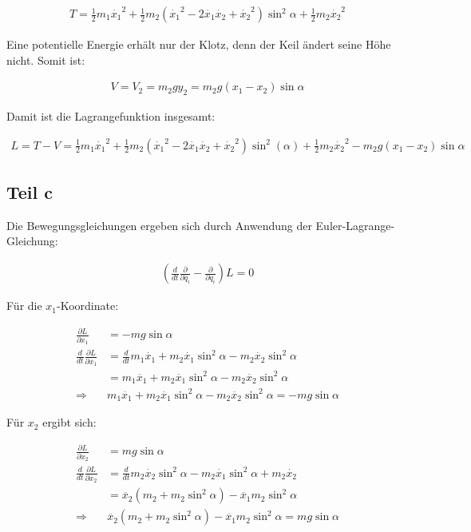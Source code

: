 \documentclass[a4paper,german,12pt,smallheadings]{scrartcl}
\begin{document}
\begin{align*}
  T = \frac{1}{2}m_1\dot{x_1}^2 + \frac{1}{2}m_2 (\dot{x_1}^2 - 2\dot{x_1}\dot{x_2}+\dot{x_2}^2) \sin^2 \alpha + \frac{1}{2} m_2 \dot{x_2}^2
\end{align*}

Eine potentielle Energie erhält nur der Klotz, denn der Keil ändert seine Höhe nicht. Somit ist:

\begin{align*}
  V = V_2 = m_2gy_2 = m_2g (x_1 - x_2) \sin \alpha
\end{align*}

Damit ist die Lagrangefunktion insgesamt:

\begin{align*}
  L = T -V = \frac{1}{2}m_1\dot{x_1}^2 + \frac{1}{2} m_2 (\dot{x_1}^2 - 2\dot{x_1}\dot{x_2}+\dot{x_2}^2) \sin^2(\alpha) + \frac{1}{2} m_2 \dot{x_2}^2 - m_2g (x_1 - x_2) \sin \alpha
\end{align*}

\subsection*{Teil c}

Die Bewegungsgleichungen ergeben sich durch Anwendung der Euler-Lagrange-Gleichung:

\begin{align*}
  \left(\frac{d}{dt}\frac{\partial}{\partial \dot{q_i}} - \frac{\partial}{\partial q_i}\right) L = 0
\end{align*}

Für die $x_1$-Koordinate:

\begin{align*}
  \frac{\partial L}{\partial x_1} &= -mg \sin \alpha \\
  \frac{d}{dt}\frac{\partial L}{\partial \dot{x_1}} &= \frac{d}{dt} m_1 \dot{x_1} + m_2\dot{x_1}\sin^2 \alpha - m_2\dot{x_2} \sin^2 \alpha \\
                                                  &= m_1\ddot{x_1} + m_2 \ddot{x_1} \sin^2 \alpha - m_2 \ddot{x_2} \sin^2 \alpha \\
  \Rightarrow\quad &m_1\ddot{x_1} + m_2 \ddot{x_1} \sin^2 \alpha - m_2 \ddot{x_2} \sin^2 \alpha = -mg \sin \alpha
\end{align*}

Für $x_2$ ergibt sich:

\begin{align*}
  \frac{\partial L}{\partial x_2} &= mg \sin \alpha \\
  \frac{d}{dt}\frac{\partial L}{\partial \dot{x_2}} &= \frac{d}{dt} m_2\dot{x_2} \sin^2 \alpha - m_2 \dot{x_1} \sin^2 \alpha + m_2\dot{x_2} \\
  &= \ddot{x_2}(m_2+m_2 \sin^2 \alpha) - \ddot{x_1} m_2 \sin^2 \alpha \\
  \Rightarrow\quad &\ddot{x_2}(m_2+m_2 \sin^2 \alpha) - \ddot{x_1} m_2 \sin^2 \alpha = mg \sin \alpha
\end{align*}
\end{document}
